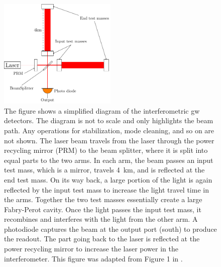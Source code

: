 \begin{figure}
	\centering
	\includegraphics[width=0.5\textwidth]{chapters/foundations/sections/cbc_searches/images/michelson_interferometer.pdf}
	\caption[Diagram of a laser interferometer gravitational-wave detector]{The figure shows a simplified diagram of the interferometric \acrshort{gw} detectors. The diagram is not to scale and only highlights the beam path. Any operations for stabilization, mode cleaning, and so on are not shown. The laser beam travels from the laser through the power recycling mirror (PRM) to the beam splitter, where it is split into equal parts to the two arms. In each arm, the beam passes an input test mass, which is a mirror, travels \SI{4}{\kilo\metre}, and is reflected at the end test mass. On its way back, a large portion of the light is again reflected by the input test mass to increase the light travel time in the arms. Together the two test masses essentially create a large Fabry-Perot cavity. Once the light passes the input test mass, it recombines and interferes with the light from the other arm. A photodiode captures the beam at the output port (south) to produce the readout. The part going back to the laser is reflected at the power recycling mirror to increase the laser power in the interferometer. This figure was adapted from Figure 1 in \cite{LIGOScientific:2014pky}.}\label{fig:detector_diagram}
\end{figure}

